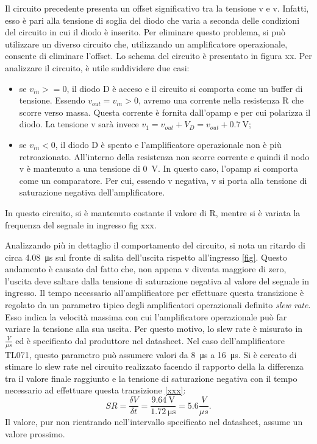 Il circuito precedente presenta un offset significativo tra la tensione v e v. Infatti, esso è pari alla tensione di soglia del diodo che varia a seconda delle condizioni del circuito in cui il diodo è inserito. Per eliminare questo problema, si può utilizzare un diverso circuito che, utilizzando un amplificatore operazionale, consente di eliminare l'offset. Lo schema del circuito è presentato in figura xx.
Per analizzare il circuito, è utile suddividere due casi:
\begin{itemize}
	\item se $v_{in}>=0$, il diodo D è acceso e il circuito si comporta come un buffer di tensione. Essendo $v_{out}=v_{in}>0$, avremo una corrente nella resistenza R che scorre verso massa. Questa corrente è fornita dall'opamp e per cui polarizza il diodo. La tensione v sarà invece $v_1=v_{out}+V_D=v_{out}+\SI{0.7}{\volt}$;
	\item se $v_{in}<0$, il diodo D è spento e l'amplificatore operazionale non è più retroazionato. All'interno della resistenza non scorre corrente e quindi il nodo v è mantenuto a una tensione di \SI{0}{\volt}. In questo caso, l'opamp si comporta come un comparatore. Per cui, essendo v negativa, v si porta alla tensione di saturazione negativa dell'amplificatore.
\end{itemize}
In questo circuito, si è mantenuto costante il valore di R, mentre si è variata la frequenza del segnale in ingresso fig xxx.

Analizzando più in dettaglio il comportamento del circuito, si nota un ritardo di circa \SI{4.08}{\micro\second} sul fronte di salita dell'uscita rispetto all'ingresso \ref{fig}.
Questo andamento è causato dal fatto che, non appena v diventa maggiore di zero, l'uscita deve saltare dalla tensione di saturazione negativa al valore del segnale in ingresso. Il tempo necessario all'amplificatore per effettuare questa transizione è regolato da un parametro tipico degli amplificatori operazionali definito \textit{slew rate}. Esso indica la velocità massima con cui l'amplificatore operazionale può far variare la tensione alla sua uscita. Per questo motivo, lo slew rate è misurato in $\frac{V}{\mu s}$ ed è specificato dal produttore nel datasheet. Nel caso dell'amplificatore TL071, questo parametro può assumere valori da \SI{8}{\micro\second} a \SI{16}{\micro\second}. Si è cercato di stimare lo slew rate nel circuito realizzato facendo il rapporto della la differenza tra il valore finale raggiunto e la tensione di saturazione negativa con il tempo necessario ad effettuare questa transizione \ref{xxx}:
\begin{equation}
	SR=\frac{\delta V}{\delta t}=\frac{\SI{9.64}{\volt}}{\SI{1.72}{\micro\second}}=5. 6\frac{V}{\mu s}.
\end{equation}
Il valore, pur non rientrando nell'intervallo specificato nel datasheet, assume un valore prossimo.


